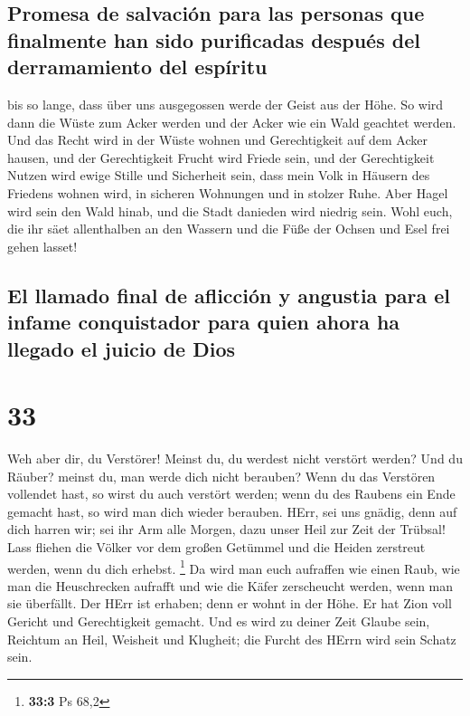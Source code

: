 \hypertarget{promesa-de-salvaciuxf3n-para-las-personas-que-finalmente-han-sido-purificadas-despuuxe9s-del-derramamiento-del-espuxedritu}{%
\subsection{Promesa de salvación para las personas que finalmente han
sido purificadas después del derramamiento del
espíritu}\label{promesa-de-salvaciuxf3n-para-las-personas-que-finalmente-han-sido-purificadas-despuuxe9s-del-derramamiento-del-espuxedritu}}

 bis so lange, dass über uns ausgegossen werde der Geist
aus der Höhe. So wird dann die Wüste zum Acker werden und der Acker wie
ein Wald geachtet werden.  Und das Recht wird in der
Wüste wohnen und Gerechtigkeit auf dem Acker hausen,  und
der Gerechtigkeit Frucht wird Friede sein, und der Gerechtigkeit Nutzen
wird ewige Stille und Sicherheit sein,  dass mein Volk in
Häusern des Friedens wohnen wird, in sicheren Wohnungen und in stolzer
Ruhe.  Aber Hagel wird sein den Wald hinab, und die Stadt
danieden wird niedrig sein.  Wohl euch, die ihr säet
allenthalben an den Wassern und die Füße der Ochsen und Esel frei gehen
lasset!

\hypertarget{el-llamado-final-de-aflicciuxf3n-y-angustia-para-el-infame-conquistador-para-quien-ahora-ha-llegado-el-juicio-de-dios}{%
\subsection{El llamado final de aflicción y angustia para el infame
conquistador para quien ahora ha llegado el juicio de
Dios}\label{el-llamado-final-de-aflicciuxf3n-y-angustia-para-el-infame-conquistador-para-quien-ahora-ha-llegado-el-juicio-de-dios}}

\hypertarget{section-32}{%
\section{33}\label{section-32}}

 Weh aber dir, du Verstörer! Meinst du, du werdest nicht
verstört werden? Und du Räuber? meinst du, man werde dich nicht
berauben? Wenn du das Verstören vollendet hast, so wirst du auch
verstört werden; wenn du des Raubens ein Ende gemacht hast, so wird man
dich wieder berauben.  HErr, sei uns gnädig, denn auf dich
harren wir; sei ihr Arm alle Morgen, dazu unser Heil zur Zeit der
Trübsal!  Lass fliehen die Völker vor dem großen Getümmel
und die Heiden zerstreut werden, wenn du dich erhebst. \footnote{\textbf{33:3}
  Ps 68,2}  Da wird man euch aufraffen wie einen Raub, wie
man die Heuschrecken aufrafft und wie die Käfer zerscheucht werden, wenn
man sie überfällt.  Der HErr ist erhaben; denn er wohnt in
der Höhe. Er hat Zion voll Gericht und Gerechtigkeit gemacht.
 Und es wird zu deiner Zeit Glaube sein, Reichtum an Heil,
Weisheit und Klugheit; die Furcht des HErrn wird sein Schatz sein.


